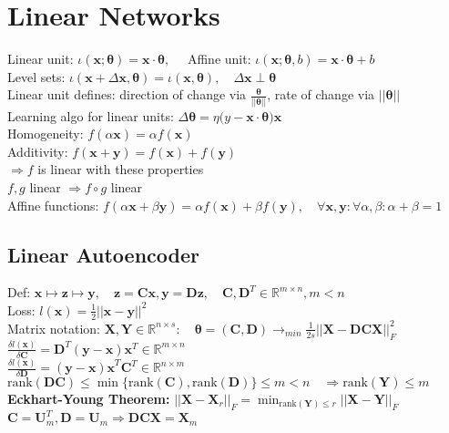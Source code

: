 \section*{Linear Networks}
Linear unit: $\iota(\mathbf x;\pmb\theta)=\mathbf x\cdot \pmb\theta,\quad$ Affine unit: $\iota(\mathbf x;\pmb\theta,b)=\mathbf x\cdot \pmb\theta+b$\\
Level sets: $\iota(\mathbf x +\Delta\mathbf x,\mathbf \theta)=\iota(\mathbf x, \mathbf \theta), \quad \Delta\mathbf x\perp \mathbf \theta$\\
Linear unit defines: direction of change via $\mathbf{\frac{\theta}{||\theta||}}$, rate of change via $||\mathbf \theta||$\\
Learning algo for linear units: $\Delta\mathbf\theta=\eta(y-\mathbf{x\cdot\theta)x}$\\
Homogeneity: $f(\alpha \mathbf x)=\alpha f(\mathbf x)$\\
Additivity: $f(\mathbf{x+y})=f(\mathbf x)+f(\mathbf y)$\\
$\Rightarrow f$ is linear with these properties\\
$f, g$ linear $\Rightarrow f\circ g$ linear\\
Affine functions: $f(\alpha\mathbf x+\beta\mathbf y)=\alpha f(\mathbf x)+\beta f(\mathbf y), \quad \forall\mathbf{x,y}:\forall \alpha,\beta: \alpha+\beta = 1$
\subsection*{Linear Autoencoder}
Def: $\mathbf{x\mapsto z \mapsto y}, \quad \mathbf{z=Cx, y=Dz, \quad C,D}^T\in\mathbb R^{m\times n}, m<n$\\
Loss: $l(\mathbf x)=\frac{1}{2}||\mathbf{x-y}||^2$\\
Matrix notation: $\mathbf{X,Y}\in\mathbb{R}^{n\times s}:\quad \mathbf{\theta=(C,D)}\rightarrow_{min}\frac{1}{2s}||\mathbf{X-DCX}||^2_F$\\
$\frac{\delta l(\mathbf x)}{\delta\mathbf C}=\mathbf D^T(\mathbf{y-x})\mathbf x^T\in\mathbb R^{m\times n}$\\
$\frac{\delta l(\mathbf x)}{\delta\mathbf D}=\mathbf{(y-x)x}^T\mathbf C^T\in\mathbb{R}^{n\times m}$\\
$\text{rank}(\mathbf{DC})\leq\min\{\text{rank}(\mathbf C), \text{rank}(\mathbf D)\}\leq m<n \quad\Rightarrow  \text{rank}(\mathbf{Y})\leq m$\\
\textbf{Eckhart-Young Theorem: } $||\mathbf{X-X}_r||_F=\min_{\text{rank}(\mathbf Y)\leq r}||\mathbf{X-Y}||_F$\\
$\mathbf{C=U}_m^T, \mathbf{D=U}_m \Rightarrow \mathbf{DCX=X}_m$
